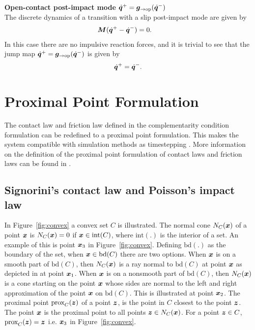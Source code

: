 \documentclass[../DC2017114Bouma.tex]{subfiles}
\begin{document}
\textbf{Open-contact post-impact mode} $\dot{{\boldsymbol{q}}}^+ = {\boldsymbol{g}}_{\rightarrow\text{op}}(\dot{{\boldsymbol{q}}}^-)$\\
The discrete dynamics of a transition with a slip post-impact mode are given by
\begin{align}
&{\boldsymbol{M}}(\dot{{\boldsymbol{q}}}^+ - \dot{{\boldsymbol{q}}}^-) = 0.\label{eq:appdiscopen}
\end{align}
In this case there are no impulsive reaction forces, and it is trivial to see that the jump map $\dot{{\boldsymbol{q}}}^+ = {\boldsymbol{g}}_{\rightarrow\text{op}}(\dot{{\boldsymbol{q}}}^-)$ is given by
\begin{align}
\dot{{\boldsymbol{q}}}^+ = \dot{{\boldsymbol{q}}}^-.\label{eq:appgopen}
\end{align}

\section{Proximal Point Formulation}
The contact law and friction law defined in the complementarity condition formulation can be redefined to a proximal point formulation. This makes the system compatible with simulation methods as timestepping \cite[Chapter 10]{Acary2008}. More information on the definition of the proximal point formulation of contact laws and friction laws can be found in \cite[Section 5.3]{Leine2008}.

\subsection{Signorini's contact law and Poisson's impact law}
In Figure~\ref{fig:convex} a convex set $C$ is illustrated. The normal cone $N_C({\boldsymbol{x}})$ of a point ${\boldsymbol{x}}$ is $N_C({\boldsymbol{x}})=0$ if ${\boldsymbol{x}}\in \text{int}(C)$, where $\text{int}(.)$ is the interior of a set. An example of this is point ${\boldsymbol{x}}_3$ in Figure~\ref{fig:convex}. Defining $\text{bd}(.)$ as the boundary of the set, when ${\boldsymbol{x}}\in \text{bd}(C)$ there are two options. When ${\boldsymbol{x}}$ is on a smooth part of $\text{bd}(C)$, then $N_C({\boldsymbol{x}})$ is a ray normal to $\text{bd}(C)$ at point ${\boldsymbol{x}}$ as depicted in at point ${\boldsymbol{x}}_1$. When ${\boldsymbol{x}}$ is on a nonsmooth part of $\text{bd}(C)$, then $N_C({\boldsymbol{x}})$ is a cone starting on the point ${\boldsymbol{x}}$ whose sides are normal to the left and right approximation of the point ${\boldsymbol{x}}$ on $\text{bd}(C)$. This is illustrated at point ${\boldsymbol{x}}_2$. The proximal point $\operatorname{\text{prox}}_C({\boldsymbol{z}})$ of a point ${\boldsymbol{z}}$, is the point in $C$ closest to the point ${\boldsymbol{z}}$. The point ${\boldsymbol{x}}$ is the proximal point to all points  ${\boldsymbol{z}}\in N_C({\boldsymbol{x}})$. For a point ${\boldsymbol{z}}\in C$, $\operatorname{\text{prox}}_C({\boldsymbol{z}}) = {\boldsymbol{z}}$ i.e. ${\boldsymbol{x}}_3$ in Figure~\ref{fig:convex}.
\end{document}
